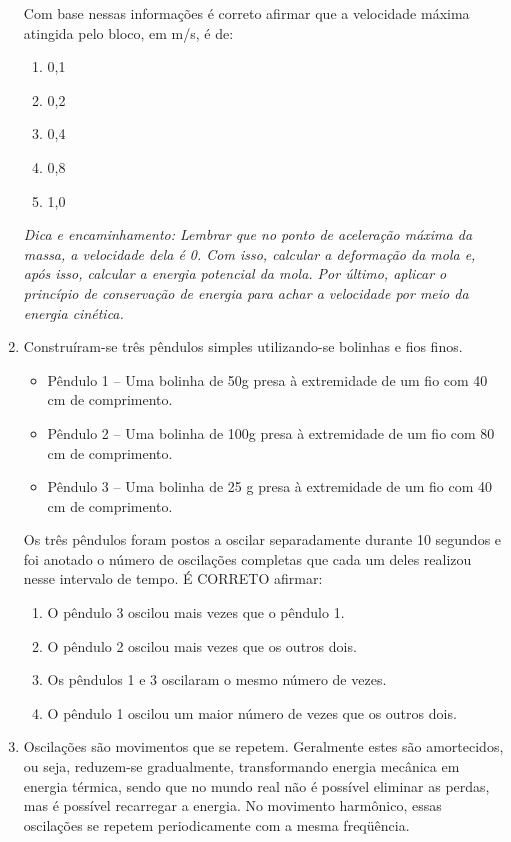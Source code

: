 \documentclass[12pt,letterpaper,fleqn]{article}
\begin{document}
\begin{enumerate}
\begin{figure}[H]
    \end{figure}
    Com base nessas informações é correto afirmar que a velocidade máxima atingida pelo bloco, em m/s, é de:
    \begin{enumerate}
        \item 0,1
        \item 0,2
        \item 0,4
        \item 0,8
        \item 1,0
    \end{enumerate}
    \textit{Dica e encaminhamento: Lembrar que no ponto de aceleração máxima da massa, a velocidade dela é 0. Com isso, calcular a deformação da mola e, após isso, calcular a energia potencial da mola. Por último, aplicar o princípio de conservação de energia para achar a velocidade por meio da energia cinética.}
    
    \item Construíram-se três pêndulos simples utilizando-se bolinhas e fios finos.

\begin{itemize}
    \item Pêndulo 1 – Uma bolinha de  50g presa à extremidade de um fio com 40 cm de comprimento.
\item Pêndulo 2 – Uma bolinha de 100g presa à extremidade de um fio com 80 cm de comprimento.
\item Pêndulo 3 – Uma bolinha de 25 g presa à extremidade de um fio com 40 cm de comprimento.
\end{itemize}

Os três pêndulos foram postos a oscilar separadamente durante 10 segundos e foi anotado o número de oscilações completas que cada um deles realizou nesse intervalo de tempo. É CORRETO afirmar:
\begin{enumerate}
    \item O pêndulo 3 oscilou mais vezes que o pêndulo 1.
    \item O pêndulo 2 oscilou mais vezes que os outros dois.
    \item Os pêndulos 1 e 3 oscilaram  o mesmo número de vezes.
    \item O pêndulo 1 oscilou um maior número de vezes que os outros dois.
\end{enumerate}

\item Oscilações são movimentos que se repetem. Geralmente estes são amortecidos, ou seja, reduzem-se gradualmente, transformando energia mecânica em energia térmica, sendo que no mundo real não é possível eliminar as perdas, mas é possível recarregar a energia. No movimento harmônico, essas oscilações se repetem periodicamente com a mesma freqüência.


\end{enumerate}
\end{document}
